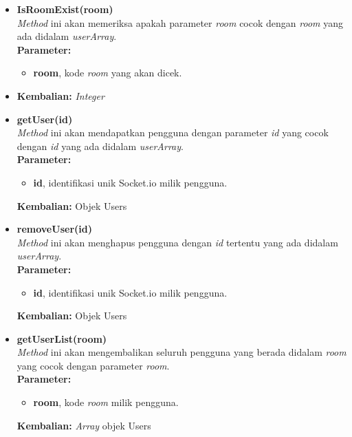 \begin{enumerate}
\begin{enumerate}
\begin{itemize}
\begin{itemize}
				\item \textbf{IsRoomExist(room)} \\
				\textit{Method} ini akan memeriksa apakah parameter \textit{room} cocok dengan \textit{room} yang ada didalam \textit{userArray}. \\
				\textbf{Parameter:}
				\begin{itemize}
					\item \textbf{room}, kode \textit{room} yang akan dicek.
				\end{itemize}
				\item \textbf{Kembalian:} \textit{Integer}
				
				\item \textbf{getUser(id)} \\
				\textit{Method} ini akan mendapatkan pengguna dengan parameter \textit{id} yang cocok dengan \textit{id} yang ada didalam \textit{userArray}. \\
				\textbf{Parameter:}
				\begin{itemize}
					\item \textbf{id}, identifikasi unik Socket.io milik pengguna.
				\end{itemize}
				\textbf{Kembalian:} Objek Users
				
				\item \textbf{removeUser(id)} \\ 
				\textit{Method} ini akan menghapus pengguna dengan \textit{id} tertentu yang ada didalam \textit{userArray}. \\
				\textbf{Parameter:}
				\begin{itemize}
					\item \textbf{id}, identifikasi unik Socket.io milik pengguna.
				\end{itemize}
				\textbf{Kembalian:} Objek Users
				
				\item \textbf{getUserList(room)} \\
				\textit{Method} ini akan mengembalikan seluruh pengguna yang berada didalam \textit{room} yang cocok dengan parameter \textit{room}. \\
				\textbf{Parameter:}
				\begin{itemize}
					\item \textbf{room}, kode \textit{room} milik pengguna.
				\end{itemize}
				\textbf{Kembalian:} \textit{Array} objek Users
			\end{itemize}
			

\end{itemize}
\end{enumerate}
\end{enumerate}
